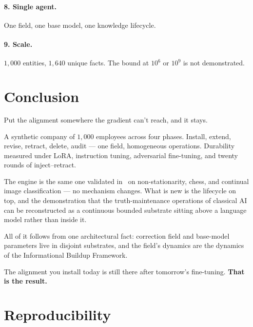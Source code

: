 \documentclass[11pt,twocolumn]{article}
\theoremstyle{plain}
\begin{document}
\paragraph{8. Single agent.}
One field, one base model, one knowledge lifecycle.

\paragraph{9. Scale.}
$1{,}000$ entities, $1{,}640$ unique facts. The bound at $10^6$ or $10^9$ is not demonstrated.

\section{Conclusion}
\label{sec:conclusion}

Put the alignment somewhere the gradient can't reach, and it stays.

A synthetic company of $1{,}000$ employees across four phases. Install, extend, revise, retract, delete, audit --- one field, homogeneous operations. Durability measured under LoRA, instruction tuning, adversarial fine-tuning, and twenty rounds of inject--retract.

The engine is the same one validated in~\cite{negulescu2026ibf} on non-stationarity, chess, and continual image classification --- no mechanism changes. What is new is the lifecycle on top, and the demonstration that the truth-maintenance operations of classical AI can be reconstructed as a continuous bounded substrate sitting above a language model rather than inside it.

All of it follows from one architectural fact: correction field and base-model parameters live in disjoint substrates, and the field's dynamics are the dynamics of the Informational Buildup Framework.

The alignment you install today is still there after tomorrow's fine-tuning. \textbf{That is the result.}

\vspace{1em}
\section*{Reproducibility}
\end{document}
